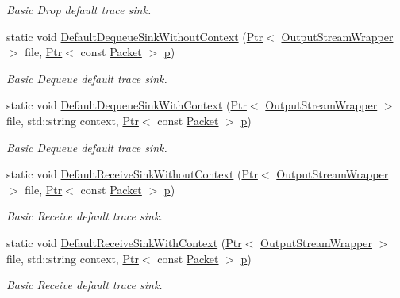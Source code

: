 \begin{DoxyCompactItemize}
\begin{DoxyCompactList}\small\item\em Basic Drop default trace sink. \end{DoxyCompactList}\item 
static void \hyperlink{classns3_1_1AsciiTraceHelper_a960cf13aa3f92a7e3d39fb0e54a4d6b2}{Default\+Dequeue\+Sink\+Without\+Context} (\hyperlink{classns3_1_1Ptr}{Ptr}$<$ \hyperlink{classns3_1_1OutputStreamWrapper}{Output\+Stream\+Wrapper} $>$ file, \hyperlink{classns3_1_1Ptr}{Ptr}$<$ const \hyperlink{classns3_1_1Packet}{Packet} $>$ \hyperlink{lte__link__budget__x2__handover__measures_8m_ac9de518908a968428863f829398a4e62}{p})
\begin{DoxyCompactList}\small\item\em Basic Dequeue default trace sink. \end{DoxyCompactList}\item 
static void \hyperlink{classns3_1_1AsciiTraceHelper_ad2f98ee493ff5ce4d775e72bb311242a}{Default\+Dequeue\+Sink\+With\+Context} (\hyperlink{classns3_1_1Ptr}{Ptr}$<$ \hyperlink{classns3_1_1OutputStreamWrapper}{Output\+Stream\+Wrapper} $>$ file, std\+::string context, \hyperlink{classns3_1_1Ptr}{Ptr}$<$ const \hyperlink{classns3_1_1Packet}{Packet} $>$ \hyperlink{lte__link__budget__x2__handover__measures_8m_ac9de518908a968428863f829398a4e62}{p})
\begin{DoxyCompactList}\small\item\em Basic Dequeue default trace sink. \end{DoxyCompactList}\item 
static void \hyperlink{classns3_1_1AsciiTraceHelper_ae3ddf1e4178fb6fab83c55632c2eed03}{Default\+Receive\+Sink\+Without\+Context} (\hyperlink{classns3_1_1Ptr}{Ptr}$<$ \hyperlink{classns3_1_1OutputStreamWrapper}{Output\+Stream\+Wrapper} $>$ file, \hyperlink{classns3_1_1Ptr}{Ptr}$<$ const \hyperlink{classns3_1_1Packet}{Packet} $>$ \hyperlink{lte__link__budget__x2__handover__measures_8m_ac9de518908a968428863f829398a4e62}{p})
\begin{DoxyCompactList}\small\item\em Basic Receive default trace sink. \end{DoxyCompactList}\item 
static void \hyperlink{classns3_1_1AsciiTraceHelper_a344e3964ea89001f9df29659ac2dd4bf}{Default\+Receive\+Sink\+With\+Context} (\hyperlink{classns3_1_1Ptr}{Ptr}$<$ \hyperlink{classns3_1_1OutputStreamWrapper}{Output\+Stream\+Wrapper} $>$ file, std\+::string context, \hyperlink{classns3_1_1Ptr}{Ptr}$<$ const \hyperlink{classns3_1_1Packet}{Packet} $>$ \hyperlink{lte__link__budget__x2__handover__measures_8m_ac9de518908a968428863f829398a4e62}{p})
\begin{DoxyCompactList}\small\item\em Basic Receive default trace sink. \end{DoxyCompactList}\end{DoxyCompactItemize}


